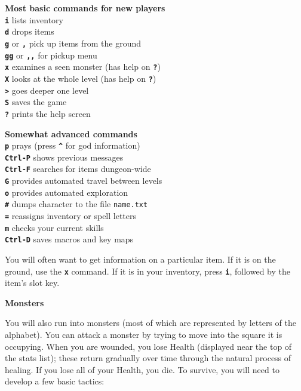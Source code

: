 \documentclass[a4paper,10pt]{article}
\newcommand{\key}[1]{{{\texttt{\textbf{#1}}}}} %
\newcommand{\sex}[1]{{{\textbf{#1}}}} %
\newcommand{\spacecolumn}{\begin{minipage}[t]{2cm}\phantom{xxxx}\end{minipage}}
\newcommand{\para}{\vspace{1.5ex}}
\begin{document}
\begin{minipage}[t]{7cm}
\sex{Most basic commands for new players} \\
\key{i} lists inventory \\
\key{d}	drops items \\
\key{g} or \key{,} pick up items from the ground \\
\key{gg} or \key{,,} for pickup menu \\
\key{x} examines a seen monster (has help on \key{?}) \\
\key{X} looks at the whole level (has help on \key{?}) \\
\key{>} goes deeper one level \\
\key{S} saves the game \\
\key{?} prints the help screen
\end{minipage}
%
\spacecolumn
%
\begin{minipage}[t]{7cm}
\sex{Somewhat advanced commands} \\
\key{p} prays (press \key{\^} for god information) \\
\key{Ctrl-P} shows previous messages \\
\key{Ctrl-F} searches for items dungeon-wide \\
\key{G} provides automated travel between levels \\
\key{o} provides automated exploration \\
\key{\#} dumps character to the file \texttt{name.txt} \\
\key{=} reassigns inventory or spell letters \\
\key{m} checks your current skills \\ 
\key{Ctrl-D} saves macros and key maps
\end{minipage}

\para

You will often want to get information on a particular item. If it is on the
ground, use the \key{x} command. If it is in your inventory, press \key{i},
followed by the item's slot key.

\para\para

\sex{Monsters} \para 

You will also run into monsters (most of which are represented by letters of 
the alphabet). You can attack a monster by trying to move into the square it 
is occupying. 
When you are wounded, you lose Health (displayed near the top of the stats 
list); these return gradually over time through the natural process of 
healing. If you lose all of your Health, you die. 
To survive, you will need to develop a few basic tactics: \\
\end{document}
